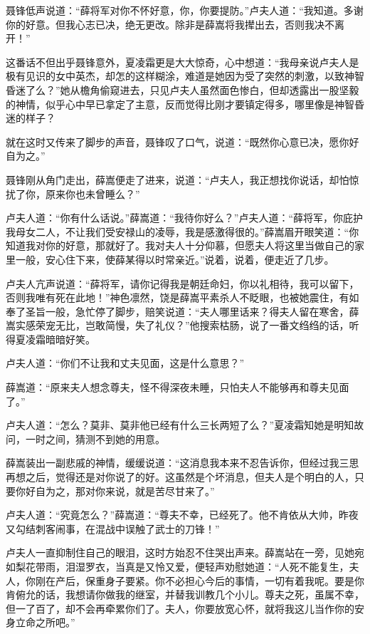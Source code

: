 \documentclass[12pt,oneside]{book}
\begin{document}
聂锋低声说道：``薛将军对你不怀好意，你，你要提防。''卢夫人道：``我知道。多谢你的好意。但我心志已决，绝无更改。除非是薛嵩将我撵出去，否则我决不离开！''

这番话不但出乎聂锋意外，夏凌霜更是大大惊奇，心中想道：``我母亲说卢夫人是极有见识的女中英杰，却怎的这样糊涂，难道是她因为受了突然的刺激，以致神智昏迷了么？''她从檐角偷窥进去，只见卢夫人虽然面色惨白，但却透露出一股坚毅的神情，似乎心中早已拿定了主意，反而觉得比刚才要镇定得多，哪里像是神智昏迷的样子？

就在这时又传来了脚步的声音，聂锋叹了口气，说道：``既然你心意已决，愿你好自为之。''

聂锋刚从角门走出，薛嵩便走了进来，说道：``卢夫人，我正想找你说话，却怕惊扰了你，原来你也未曾睡么？''

卢夫人道：``你有什么话说。''薛嵩道：``我待你好么？''卢夫人道：``薛将军，你庇护我母女二人，不让我们受安禄山的凌辱，我是感激得很的。''薛嵩眉开眼笑道：``你知道我对你的好意，那就好了。我对夫人十分仰慕，但愿夫人将这里当做自己的家里一般，安心住下来，使薛某得以时常亲近。''说着，说着，便走近了几步。

卢夫人亢声说道：``薛将军，请你记得我是朝廷命妇，你以礼相待，我可以留下，否则我唯有死在此地！''神色凛然，饶是薛嵩平素杀人不眨眼，也被她震住，有如奉了圣旨一般，急忙停了脚步，赔笑说道：``夫人哪里话来？得夫人留在寒舍，薛嵩实感荣宠无比，岂敢简慢，失了礼仪？''他搜索枯肠，说了一番文绉绉的话，听得夏凌霜暗暗好笑。

卢夫人道：``你们不让我和丈夫见面，这是什么意思？''

薛嵩道：``原来夫人想念尊夫，怪不得深夜未睡，只怕夫人不能够再和尊夫见面了。''

卢夫人道：``怎么？莫非、莫非他已经有什么三长两短了么？''夏凌霜知她是明知故问，一时之间，猜测不到她的用意。

薛嵩装出一副悲戚的神情，缓缓说道：``这消息我本来不忍告诉你，但经过我三思再想之后，觉得还是对你说了的好。这虽然是个坏消息，但夫人是个明白的人，只要你好自为之，那对你来说，就是苦尽甘来了。''

卢夫人道：``究竟怎么？''薛嵩道：``尊夫不幸，已经死了。他不肯依从大帅，昨夜又勾结刺客闹事，在混战中误触了武士的刀锋！''

卢夫人一直抑制住自己的眼泪，这时方始忍不住哭出声来。薛嵩站在一旁，见她宛如梨花带雨，泪湿罗衣，当真是又怜又爱，便轻声劝慰她道：``人死不能复生，夫人，你刚在产后，保重身子要紧。你不必担心今后的事情，一切有着我呢。要是你肯俯允的话，我想请你做我的继室，并替我训教几个小儿。尊夫之死，虽属不幸，但一了百了，却不会再牵累你们了。夫人，你要放宽心怀，就将我这儿当作你的安身立命之所吧。''
\end{document}
